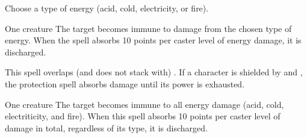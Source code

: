 \begin{spellheader}
    \spellspecial Choose a type of energy (acid, cold, electricity, or fire).
\end{spellheader}
\begin{spelleffects}
    \begin{spelltarget}{One creature}
        \spelleffect The target becomes immune to damage from the chosen type of energy. When the spell absorbs 10 points per caster level of energy damage, it is discharged.
    \end{spelltarget}
\end{spelleffects}
\begin{spellfooter}
    \spellnotes This spell overlaps (and does not stack with) . If a character is shielded by  and , the protection spell absorbs damage until its power is exhausted.
\end{spellfooter}

\begin{spellheader}
\end{spellheader}
\begin{spelleffects}
    \begin{spelltarget}{One creature}
        \spelleffect The target becomes immune to all energy damage (acid, cold, electriticity, and fire). When this spell absorbs 10 points per caster level of damage in total, regardless of its type, it is discharged.
    \end{spelltarget}
\end{spelleffects}
\begin{spellfooter}
    
\end{spellfooter}

\begin{comment}
\subsubsection{Q-R}
\end{comment}

